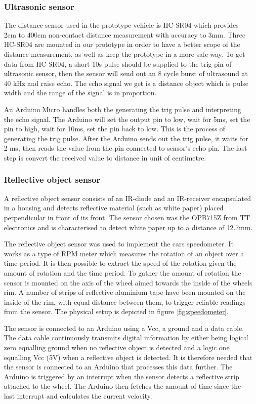 \documentclass[11pt, titlepage]{article} %
\begin{document}
\subsubsection{Ultrasonic sensor}
The distance sensor used in the prototype vehicle is HC-SR04 which provides 2cm to 400cm non-contact distance measurement with accuracy to 3mm. Three HC-SR04 are mounted in our prototype in order to have a better scope of the distance measurement, as well as keep the prototype in a more safe way. To get data from HC-SR04, a short 10\textmu s pulse should be supplied to the trig pin of ultrasonic sensor, then the sensor will send out an 8 cycle burst of ultrasound at 40 kHz and raise echo. The echo signal we get is a distance object which is pulse width and the range of the signal is in proportion. 

An Arduino Micro handles both the generating the trig pulse and interpreting the echo signal. The Arduino will set the output pin to low, wait for 5ms, set the pin to high, wait for 10ms, set the pin back to low. This is the process of generating the trig pulse. After the Arduino sends out the trig pulse, it waits for 2 ms, then reads the value from the pin connected to sensor's echo pin. The last step is convert the received value to distance in unit of centimetre.

\subsubsection{Reflective object sensor}
A reflective object sensor consists of an IR-diode and an IR-receiver encapsulated in a housing and detects reflective material (such as white paper) placed perpendicular in front of its front. The sensor chosen was the OPB715Z from TT electronics and is characterised to detect white paper up to a distance of 12.7mm.

The reflective object sensor was used to implement the cars speedometer. It works as a type of RPM meter which measures the rotation of an object over a time period. It is then possible to extract the speed of the rotation given the amount of rotation and the time period. To gather the amount of rotation the sensor is mounted on the axis of the wheel aimed towards the inside of the wheels rim. A number of strips of reflective aluminium tape have been mounted on the inside of the rim, with equal distance between them, to trigger reliable readings from the sensor. The physical setup is depicted in figure \ref{fig:speedometer}.

The sensor is connected to an Arduino using a Vcc, a ground and a data cable. The data cable continuously transmits digital information by either being logical zero equalling ground when no reflective object is detected and a logic one equalling Vcc (5V) when a reflective object is detected. It is therefore needed that the sensor is connected to an Arduino that processes this data further. The Arduino is triggered by an interrupt when the sensor detects a reflective strip attached to the wheel. The Arduino then fetches the amount of time since the last interrupt and calculates the current velocity.
\end{document}
